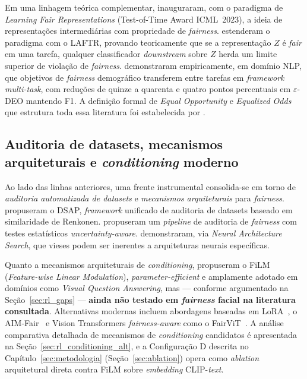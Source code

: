 Em uma linhagem teórica complementar, \textcite{zemel2013learning} inauguraram, com o paradigma de \emph{Learning Fair Representations} (Test-of-Time Award ICML~2023), a ideia de representações intermediárias com propriedade de \emph{fairness}. \textcite{madras2018learning} estenderam o paradigma com o LAFTR, provando teoricamente que se a representação $Z$ é \emph{fair} em uma tarefa, qualquer classificador \emph{downstream} sobre $Z$ herda um limite superior de violação de \emph{fairness}. \textcite{aguirre2023transferring} demonstraram empiricamente, em domínio NLP, que objetivos de \emph{fairness} demográfico transferem entre tarefas em \emph{framework multi-task}, com reduções de quinze a quarenta e quatro pontos percentuais em $\varepsilon$-DEO mantendo F1. A definição formal de \emph{Equal Opportunity} e \emph{Equalized Odds} que estrutura toda essa literatura foi estabelecida por \textcite{hardt2016equality}.

\subsection{Auditoria de datasets, mecanismos arquiteturais e \emph{conditioning} moderno}
\label{sec:rl_arquit}

Ao lado das linhas anteriores, uma frente instrumental consolida-se em torno de \emph{auditoria automatizada de datasets} e \emph{mecanismos arquiteturais} para \emph{fairness}. \textcite{dominguezcatena2024dsap} propuseram o DSAP, \emph{framework} unificado de auditoria de datasets baseado em similaridade de Renkonen. \textcite{lafargue2025fairness} propuseram um \emph{pipeline} de auditoria de \emph{fairness} com testes estatísticos \emph{uncertainty-aware}. \textcite{dooley2022rethinking} demonstraram, via \emph{Neural Architecture Search}, que vieses podem ser inerentes a arquiteturas neurais específicas.

Quanto a mecanismos arquiteturais de \emph{conditioning}, \textcite{perez2018film} propuseram o FiLM (\emph{Feature-wise Linear Modulation}), \emph{parameter-efficient} e amplamente adotado em domínios como \emph{Visual Question Answering}, mas --- conforme argumentado na Seção~\ref{sec:rl_gaps} --- \textbf{ainda não testado em \emph{fairness} facial na literatura consultada}. Alternativas modernas incluem abordagens baseadas em LoRA~\autocite{sukumaran2024fairlora,bian2025lora}, o AIM-Fair~\autocite{zhao2025aim} e Vision Transformers \emph{fairness-aware} como o FairViT~\autocite{tian2024fairvit}. A análise comparativa detalhada de mecanismos de \emph{conditioning} candidatos é apresentada na Seção~\ref{sec:rl_conditioning_alt}, e a Configuração D descrita no Capítulo~\ref{sec:metodologia} (Seção~\ref{sec:ablation}) opera como \emph{ablation} arquitetural direta contra FiLM sobre \emph{embedding} CLIP-\emph{text}.

